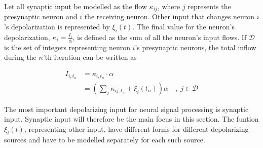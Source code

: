 	Let all synaptic input be modelled as the flow $\kappa_{ij}$, where $j$ represents the presynaptic neuron and $i$ the receiving neuron.
	Other input that changes neuron $i$'s depolarization is represented by $\xi_i(t)$.
	The final value for the neuron's depolarization, $\kappa_i = \frac{I_i}{\alpha}$, is defined as the sum of all the neuron's input flows.
	If $\mathscr{D}$ is the set of integers representing neuron $i$'s presynaptic neurons, the total inflow during the $n$'th iteration can be written as

		\begin{equation}
			\begin{split}
			I_{i, t_n} 	&= \kappa_{i,t_n} \cdot \alpha \\
						&= \left( \sum_{j} \kappa_{ij, t_n} + \xi_i(t_n) \right) \alpha \quad,\; j\in\mathscr{D}
			\end{split}
			\label{eqSynapticIntegrationForKANN}
		\end{equation}

	The most important depolarizing input for neural signal processing is synaptic input\cite{PrinciplesOfNeuralScience4edKAP10}.
	Synaptic input will therefore be the main focus in this section.
	The funtion $\xi_i(t)$, representing other input, have different forms for different depolarizing sources and have to be modelled separately for each such source.

